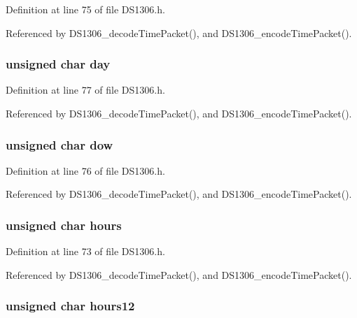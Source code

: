 Definition at line 75 of file D\-S1306.\-h.



Referenced by D\-S1306\-\_\-decode\-Time\-Packet(), and D\-S1306\-\_\-encode\-Time\-Packet().

\hypertarget{structds1306time_ab9ba6d415537c392fea1a330751865f9}{
\subsubsection[{day}]{\setlength{\rightskip}{0pt plus 5cm}unsigned char day}}\label{structds1306time_ab9ba6d415537c392fea1a330751865f9}


Definition at line 77 of file D\-S1306.\-h.



Referenced by D\-S1306\-\_\-decode\-Time\-Packet(), and D\-S1306\-\_\-encode\-Time\-Packet().

\hypertarget{structds1306time_a75aeb148620066973ea11791d72dc7cc}{
\subsubsection[{dow}]{\setlength{\rightskip}{0pt plus 5cm}unsigned char dow}}\label{structds1306time_a75aeb148620066973ea11791d72dc7cc}


Definition at line 76 of file D\-S1306.\-h.



Referenced by D\-S1306\-\_\-decode\-Time\-Packet(), and D\-S1306\-\_\-encode\-Time\-Packet().

\hypertarget{structds1306time_ad6bf06b59feb7f83117fd66cd2f365ad}{
\subsubsection[{hours}]{\setlength{\rightskip}{0pt plus 5cm}unsigned char hours}}\label{structds1306time_ad6bf06b59feb7f83117fd66cd2f365ad}


Definition at line 73 of file D\-S1306.\-h.



Referenced by D\-S1306\-\_\-decode\-Time\-Packet(), and D\-S1306\-\_\-encode\-Time\-Packet().

\hypertarget{structds1306time_ab51bff648a0be672b522ac48e8da69fc}{
\subsubsection[{hours12}]{\setlength{\rightskip}{0pt plus 5cm}unsigned char hours12}}\label{structds1306time_ab51bff648a0be672b522ac48e8da69fc}


